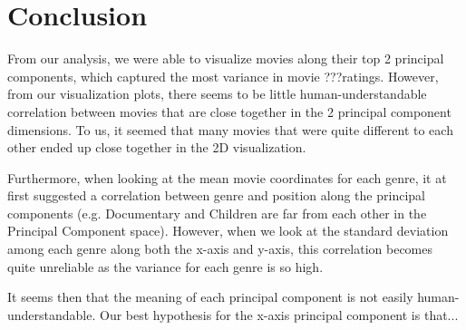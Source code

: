 \newif\ifshowsolutions
\showsolutionsfalse


\renewcommand{\headrulewidth}{0.4pt}
\graphicspath{{../output/}}



\pagestyle{fancy}




\section{Conclusion}

From our analysis, we were able to visualize movies along their top 2 principal components, which captured the most variance in movie ???ratings. However, from our visualization plots, there seems to be little human-understandable correlation between movies that are close together in the 2 principal component dimensions. To us, it seemed that many movies that were quite different to each other ended up close together in the 2D visualization. 

Furthermore, when looking at the mean movie coordinates for each genre, it at first suggested a correlation between genre and position along the principal components (e.g. Documentary and Children are far from each other in the Principal Component space). However, when we look at the standard deviation among each genre along both the x-axis and y-axis, this correlation becomes quite unreliable as the variance for each genre is so high. 

It seems then that the meaning of each principal component is not easily human-understandable. Our best hypothesis for the x-axis principal component is that...


